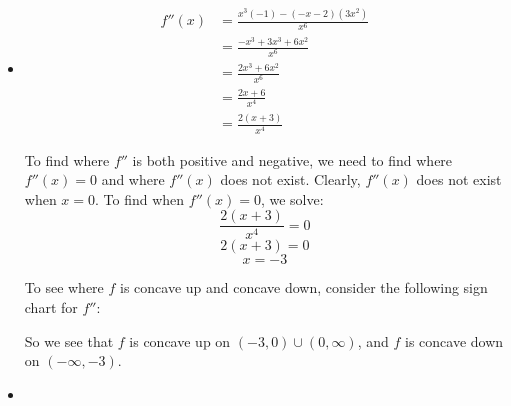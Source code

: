 \documentclass[handout,nooutcomes]{ximera}
\begin{document}
\begin{problem}
\begin{freeResponse}
\begin{itemize}
			
			
			\item  {}
			\begin{align*}
			f''(x) &= \frac{x^3(-1) - (-x-2)(3x^2)}{x^6} \\
			&= \frac{-x^3 + 3x^3 + 6x^2}{x^6} \\
			&= \frac{2x^3 + 6x^2}{x^6} \\
			&= \frac{2x+6}{x^4} \\
			&= \frac{2(x+3)}{x^4}
			\end{align*}
			
			To find where $f''$ is both positive and negative, we need to find where $f''(x) = 0$ and where $f''(x)$ does not exist.  Clearly, $f''(x)$ does not exist when $x=0$.  To find when $f''(x) = 0$, we solve:
			$$ \frac{2(x+3)}{x^4} = 0 $$
			$$ 2(x+3) = 0 $$
			$$ x=-3 $$
			
			To see where $f$ is concave up and concave down, consider the following sign chart for $f''$:
			
		
\begin{center}
\begin{image}
\end{image}
\end{center}


			So we see that $f$ is concave up on $(-3,0) \cup (0,\infty)$, and $f$ is concave down on $(-\infty, -3)$.

			
			
			
			\item  {}  \\
			

\end{itemize}
\end{freeResponse}
\end{problem}
\end{document}
